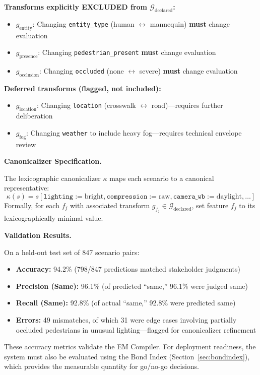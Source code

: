 \documentclass[12pt]{article}
\begin{document}
\textbf{Transforms explicitly EXCLUDED from $\mathcal{G}_{\text{declared}}$:}
\begin{itemize}
\item $g_{\text{entity}}$: Changing \texttt{entity\_type} (human $\leftrightarrow$ mannequin) \textbf{must} change evaluation
\item $g_{\text{presence}}$: Changing \texttt{pedestrian\_present} \textbf{must} change evaluation
\item $g_{\text{occlusion}}$: Changing \texttt{occluded} (none $\leftrightarrow$ severe) \textbf{must} change evaluation
\end{itemize}

\textbf{Deferred transforms (flagged, not included):}
\begin{itemize}
\item $g_{\text{location}}$: Changing \texttt{location} (crosswalk $\leftrightarrow$ road)---requires further deliberation
\item $g_{\text{fog}}$: Changing \texttt{weather} to include heavy fog---requires technical envelope review
\end{itemize}

\textbf{Canonicalizer Specification.}

The lexicographic canonicalizer $\kappa$ maps each scenario to a canonical representative:
\[
\kappa(s) = s[\texttt{lighting} := \text{bright}, \texttt{compression} := \text{raw}, \texttt{camera\_wb} := \text{daylight}, \ldots]
\]
Formally, for each $f_j$ with associated transform $g_{f_j} \in \mathcal{G}_{\text{declared}}$, set feature $f_j$ to its lexicographically
minimal value.

\textbf{Validation Results.}

On a held-out test set of 847 scenario pairs:
\begin{itemize}
\item \textbf{Accuracy:} 94.2\% (798/847 predictions matched stakeholder judgments)
\item \textbf{Precision (Same):} 96.1\% (of predicted ``same,'' 96.1\% were judged same)
\item \textbf{Recall (Same):} 92.8\% (of actual ``same,'' 92.8\% were predicted same)
\item \textbf{Errors:} 49 mismatches, of which 31 were edge cases involving partially occluded pedestrians
in unusual lighting---flagged for canonicalizer refinement
\end{itemize}

These accuracy metrics validate the EM Compiler. For deployment readiness, the system must
also be evaluated using the Bond Index (Section~\ref{sec:bondindex}), which provides the measurable quantity for
go/no-go decisions.
\end{document}

